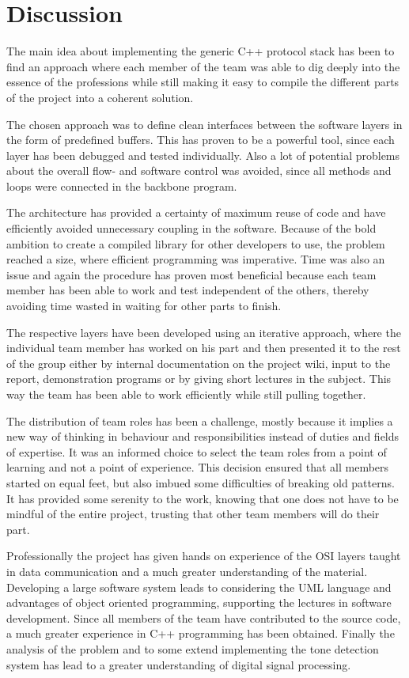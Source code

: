 \chapter{Discussion}\label{chap:discussion}
The main idea about implementing the generic C++ protocol stack has been to find an approach
where each member of the team was able to dig deeply into the essence of the
professions while still making it easy to compile the different parts of the
project into a coherent solution.

The chosen approach was to define clean interfaces between the software layers
in the form of predefined buffers. This has proven to be a powerful tool, since
each layer has been debugged and tested individually. Also a lot of potential
problems about the overall flow- and software control was avoided, since all
methods and loops were connected in the backbone program.

The architecture has provided a certainty of maximum reuse of
code and have efficiently avoided unnecessary coupling in the software. Because
of the bold ambition to create a compiled library for other developers to use, the problem reached a
size, where efficient programming was imperative. Time was also an issue and
again the procedure has proven most beneficial because each team member has been
able to work and test independent of the others, thereby avoiding time wasted in
waiting for other parts to finish.

The respective layers have been developed using an iterative approach, where
the individual team member has worked on his part and then presented it to the rest
of the group either by internal documentation on the project wiki, input to the
report, demonstration programs or by giving short lectures in the subject. This
way the team has been able to work efficiently while still pulling together.

The distribution of team roles has been a challenge, mostly because it implies a
new way of thinking in behaviour and responsibilities instead of duties and
fields of expertise. It was an informed choice to select the team roles from a
point of learning and not a point of experience. This decision ensured that
all members started on equal feet, but also imbued some difficulties of breaking
old patterns. It has provided some serenity to the work, knowing that one does
not have to be mindful of the entire project, trusting that other team members
will do their part.

Professionally the project has given hands on experience of the OSI layers
taught in data communication and a much greater understanding of the material.
Developing a large software system leads to considering the UML language and
advantages of object oriented programming, supporting the lectures in software
development. Since all members of the team have contributed to the source code,
a much greater experience in C++ programming has been obtained. Finally the
analysis of the problem and to some extend implementing the tone detection
system has lead to a greater understanding of digital signal processing.